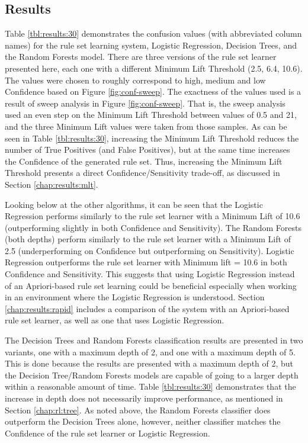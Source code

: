 \subsection{Results}


Table \ref{tbl:results:30} demonstrates the confusion values (with abbreviated column names) for the \Abb rule set learning system, Logistic Regression, Decision Trees, and the Random Forests model. 
There are three versions of the rule set learner presented here, each one with a different Minimum Lift Threshold (2.5, 6.4, 10.6). The values were chosen to roughly correspond to high, medium and low Confidence based on Figure \ref{fig:conf-sweep}.
The exactness of the values used is a result of sweep analysis in Figure \ref{fig:conf-sweep}. That is, the sweep analysis used an even step on the Minimum Lift Threshold between values of 0.5 and 21, and the three Minimum Lift values were taken from those samples.
As can be seen in Table \ref{tbl:results:30}, increasing the Minimum Lift Threshold reduces the number of True Positives (and False Positives), but at the same time increases the Confidence of the generated rule set. Thus, increasing the Minimum Lift Threshold presents a direct Confidence/Sensitivity trade-off, as discussed in Section \ref{chap:results:mlt}.

Looking below at the other algorithms, it can be seen that the Logistic Regression performs similarly to the rule set learner with a Minimum Lift of 10.6 (outperforming slightly in both Confidence and Sensitivity). The Random Forests (both depths) perform similarly to the rule set learner with a Minimum Lift of 2.5 (underperforming on Confidence but outperforming on Sensitivity).
Logistic Regression outperforms the rule set learner with Minimum lift = 10.6 in both Confidence and Sensitivity. This suggests that using Logistic Regression instead of an Apriori-based rule set learning could be beneficial especially when working in an environment where the Logistic Regression is understood. Section \ref{chap:results:rapid} includes a comparison of the \Abb system with an Apriori-based rule set learner, as well as one that uses Logistic Regression.

The Decision Trees and Random Forests classification results are presented in two variants, one with a maximum depth of 2, and one with a maximum depth of 5. This is done because the \Abb results are presented with a maximum depth of 2, but the Decision Tree/Random Forests models are capable of going to a larger depth within a reasonable amount of time. Table \ref{tbl:results:30} demonstrates that the increase in depth does not necessarily improve performance, as mentioned in Section \ref{chap:rl:tree}. As noted above, the Random Forests classifier does outperform the Decision Trees alone, however, neither classifier matches the Confidence of the \Abb rule set learner or Logistic Regression.

